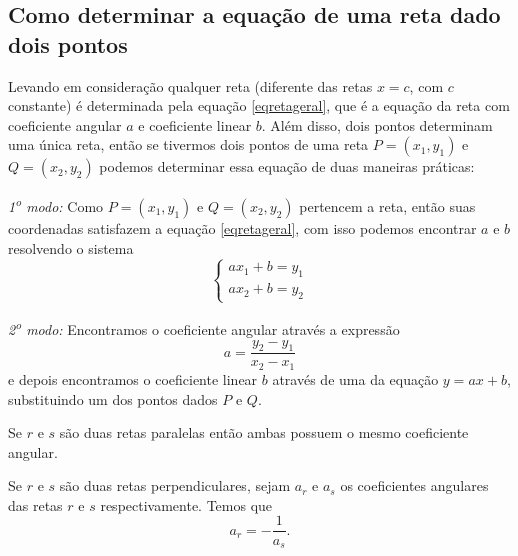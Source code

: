 \subsection{Como determinar a equação de uma reta dado dois pontos}

Levando em consideração qualquer reta (diferente das retas $x=c$, com $c$
constante) é determinada pela equação \eqref{eqretageral}, que é a equação da
reta com coeficiente angular $a$ e coeficiente linear $b$. Além disso, dois
pontos determinam uma única reta, então se tivermos dois pontos de uma reta
$P=(x_1, y_1)$ e $Q=(x_2, y_2)$ podemos determinar essa equação de duas maneiras
práticas:

\emph{1\textsuperscript{o} modo:}
Como $P=(x_1, y_1)$ e $Q=(x_2, y_2)$ pertencem a reta,
então suas coordenadas satisfazem a equação \ref{eqretageral}, com isso podemos
encontrar $a$ e $b$ resolvendo o sistema
\[
  \begin{cases}
    ax_1+b=y_1 \\
    ax_2+b=y_2
  \end{cases}
\]

\emph{2\textsuperscript{o} modo:}
Encontramos o coeficiente angular através a
expressão
\[
  a = \frac{y_2-y_1}{x_2-x_1}
\]
e depois encontramos o coeficiente linear $b$ através de uma da
equação $y=ax+b$, substituindo um dos pontos dados
$P$ e $Q$.

\begin{observation}
  Se $r$ e $s$ são duas retas paralelas então ambas possuem o mesmo
  coeficiente angular.
\end{observation}

\begin{observation}
  Se $r$ e $s$ são duas retas perpendiculares, sejam $a_r$ e $a_s$ os
  coeficientes angulares das retas $r$ e $s$ respectivamente. Temos que
  \[
    a_r=-\frac{1}{a_s}.
  \]
\end{observation}


